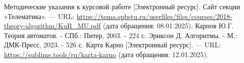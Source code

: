 \documentclass[11pt,a4paper,final]{article} %
\begin{document}
\newpage
{}
\begin{thebibliography}{0}
	 Методические указания к курсовой работе [Электронный ресурс]. Сайт секции «Телематика». — URL: \href{https://tema.spbstu.ru/userfiles/files/courses/2018-theory-algorithm/KuR_MU.pdf}{https://tema.spbstu.ru/userfiles/files/courses/2018-theory-algorithm/KuR\_MU.pdf} (дата обращения: 08.01.2025).
	  Карпов Ю.Г. Теория автоматов. - СПб.: Питер, 2003. - 224 с.
	 Эриксон Д. Алгоритмы. - М.: ДМК-Пресс, 2023. - 526 с.
	 Карта Карно [Электронный ресурс]. — URL: \href{https://sublime.tools/ru/karta-karno}{https://sublime.tools/ru/karta-karno} (дата обращения: 12.01.2025).
	
\end{thebibliography}

 
\end{document}
